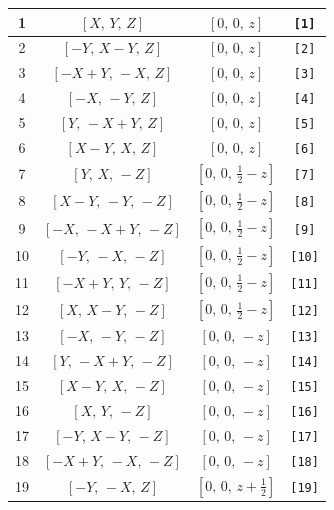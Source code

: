 \documentclass[fleqn,8pt]{jsarticle}
\begin{document}
\begin{longtable}{cccc}
1 & $\left[ X,\, Y,\, Z \right]$ & $\left[ 0,\, 0,\, z \right]$ & {\tt [1]} \\ \hline
2 & $\left[ - Y,\, X - Y,\, Z \right]$ & $\left[ 0,\, 0,\, z \right]$ & {\tt [2]} \\ \hline
3 & $\left[ - X + Y,\, - X,\, Z \right]$ & $\left[ 0,\, 0,\, z \right]$ & {\tt [3]} \\ \hline
4 & $\left[ - X,\, - Y,\, Z \right]$ & $\left[ 0,\, 0,\, z \right]$ & {\tt [4]} \\ \hline
5 & $\left[ Y,\, - X + Y,\, Z \right]$ & $\left[ 0,\, 0,\, z \right]$ & {\tt [5]} \\ \hline
6 & $\left[ X - Y,\, X,\, Z \right]$ & $\left[ 0,\, 0,\, z \right]$ & {\tt [6]} \\ \hline
7 & $\left[ Y,\, X,\, - Z \right]$ & $\left[ 0,\, 0,\, \frac{1}{2} - z \right]$ & {\tt [7]} \\ \hline
8 & $\left[ X - Y,\, - Y,\, - Z \right]$ & $\left[ 0,\, 0,\, \frac{1}{2} - z \right]$ & {\tt [8]} \\ \hline
9 & $\left[ - X,\, - X + Y,\, - Z \right]$ & $\left[ 0,\, 0,\, \frac{1}{2} - z \right]$ & {\tt [9]} \\ \hline
10 & $\left[ - Y,\, - X,\, - Z \right]$ & $\left[ 0,\, 0,\, \frac{1}{2} - z \right]$ & {\tt [10]} \\ \hline
11 & $\left[ - X + Y,\, Y,\, - Z \right]$ & $\left[ 0,\, 0,\, \frac{1}{2} - z \right]$ & {\tt [11]} \\ \hline
12 & $\left[ X,\, X - Y,\, - Z \right]$ & $\left[ 0,\, 0,\, \frac{1}{2} - z \right]$ & {\tt [12]} \\ \hline
13 & $\left[ - X,\, - Y,\, - Z \right]$ & $\left[ 0,\, 0,\, - z \right]$ & {\tt [13]} \\ \hline
14 & $\left[ Y,\, - X + Y,\, - Z \right]$ & $\left[ 0,\, 0,\, - z \right]$ & {\tt [14]} \\ \hline
15 & $\left[ X - Y,\, X,\, - Z \right]$ & $\left[ 0,\, 0,\, - z \right]$ & {\tt [15]} \\ \hline
16 & $\left[ X,\, Y,\, - Z \right]$ & $\left[ 0,\, 0,\, - z \right]$ & {\tt [16]} \\ \hline
17 & $\left[ - Y,\, X - Y,\, - Z \right]$ & $\left[ 0,\, 0,\, - z \right]$ & {\tt [17]} \\ \hline
18 & $\left[ - X + Y,\, - X,\, - Z \right]$ & $\left[ 0,\, 0,\, - z \right]$ & {\tt [18]} \\ \hline
19 & $\left[ - Y,\, - X,\, Z \right]$ & $\left[ 0,\, 0,\, z + \frac{1}{2} \right]$ & {\tt [19]} \\ \hline

\end{longtable}
\end{document}
